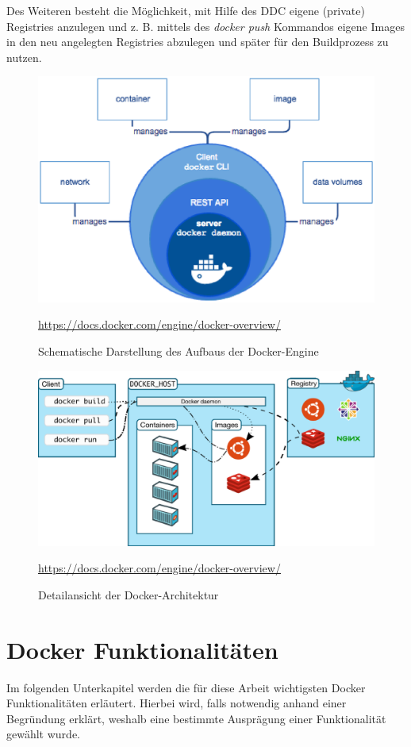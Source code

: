 Des Weiteren besteht die Möglichkeit, mit Hilfe des \ac{DDC} eigene (private) Registries anzulegen und z. B. mittels des \textit{docker push} Kommandos eigene Images in den neu angelegten Registries abzulegen und später für den Buildprozess zu nutzen.

\begin{figure}
	\centering
	\includegraphics[width=0.7\linewidth]{figures/DockerEngine}
	\caption[Aufbau Docker-Engine]{Schematische Darstellung des Aufbaus der Docker-Engine}
	\label{fig:dockerengine}
	\tiny{\quelle\url{https://docs.docker.com/engine/docker-overview/}}
\end{figure}

\begin{figure}
	\centering
	\includegraphics[width=0.7\linewidth]{figures/DockerArchitecture}
	\caption[Detailansicht der Docker-Architektur]{Detailansicht der Docker-Architektur}
	\label{fig:dockerarchitecture}
	\tiny{\quelle\url{https://docs.docker.com/engine/docker-overview/}}
\end{figure}

\section{Docker Funktionalitäten}
\label{c:funktionalität}

Im folgenden Unterkapitel werden die für diese Arbeit wichtigsten Docker Funktionalitäten erläutert.
Hierbei wird, falls notwendig anhand einer Begründung erklärt, weshalb eine bestimmte Ausprägung einer Funktionalität gewählt wurde.

